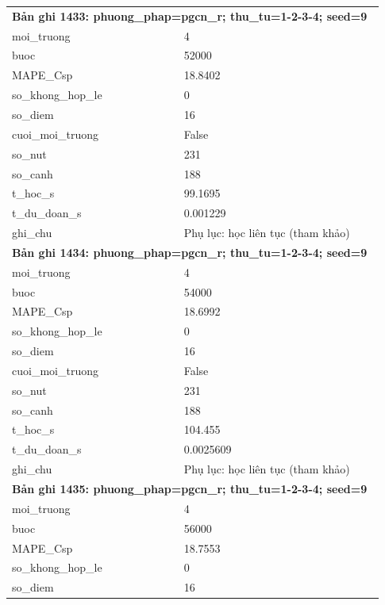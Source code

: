 \begin{longtable}{p{0.43\linewidth}p{0.50\linewidth}}
\midrule
\multicolumn{2}{p{0.95\linewidth}}{\textbf{Bản ghi 1433: phuong\_phap=pgcn\_r; thu\_tu=1-2-3-4; seed=9}} \\
moi\_\allowbreak truong & 4 \\
buoc & 52000 \\
MAPE\_\allowbreak Csp & 18.8402 \\
so\_\allowbreak khong\_\allowbreak hop\_\allowbreak le & 0 \\
so\_\allowbreak diem & 16 \\
cuoi\_\allowbreak moi\_\allowbreak truong & False \\
so\_\allowbreak nut & 231 \\
so\_\allowbreak canh & 188 \\
t\_\allowbreak hoc\_\allowbreak s & 99.1695 \\
t\_\allowbreak du\_\allowbreak doan\_\allowbreak s & 0.001229 \\
ghi\_\allowbreak chu & Phụ lục: học liên tục (tham khảo) \\
\midrule
\multicolumn{2}{p{0.95\linewidth}}{\textbf{Bản ghi 1434: phuong\_phap=pgcn\_r; thu\_tu=1-2-3-4; seed=9}} \\
moi\_\allowbreak truong & 4 \\
buoc & 54000 \\
MAPE\_\allowbreak Csp & 18.6992 \\
so\_\allowbreak khong\_\allowbreak hop\_\allowbreak le & 0 \\
so\_\allowbreak diem & 16 \\
cuoi\_\allowbreak moi\_\allowbreak truong & False \\
so\_\allowbreak nut & 231 \\
so\_\allowbreak canh & 188 \\
t\_\allowbreak hoc\_\allowbreak s & 104.455 \\
t\_\allowbreak du\_\allowbreak doan\_\allowbreak s & 0.0025609 \\
ghi\_\allowbreak chu & Phụ lục: học liên tục (tham khảo) \\
\midrule
\multicolumn{2}{p{0.95\linewidth}}{\textbf{Bản ghi 1435: phuong\_phap=pgcn\_r; thu\_tu=1-2-3-4; seed=9}} \\
moi\_\allowbreak truong & 4 \\
buoc & 56000 \\
MAPE\_\allowbreak Csp & 18.7553 \\
so\_\allowbreak khong\_\allowbreak hop\_\allowbreak le & 0 \\
so\_\allowbreak diem & 16 \\

\end{longtable}
